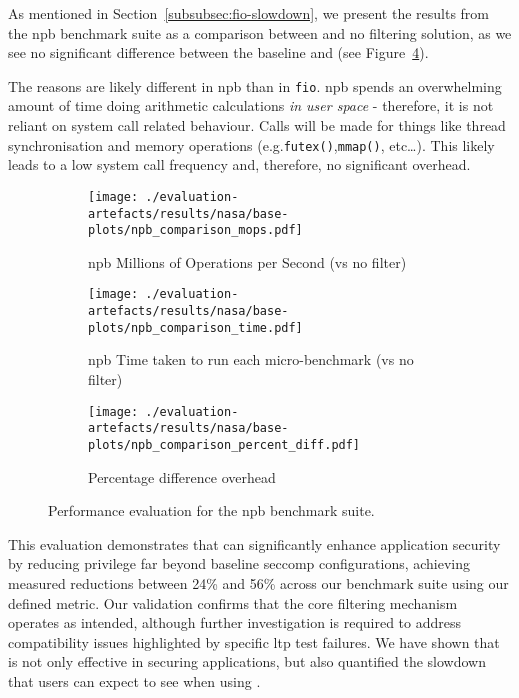 As mentioned in Section~\ref{subsubsec:fio-slowdown}, we present the results
from the \ac{npb} benchmark suite as a comparison between \af and no filtering
solution, as we see no significant difference between the baseline and \af (see
Figure~\ref{fig:npb-perf}).

The reasons are likely different in \ac{npb} than in \texttt{fio}. \ac{npb}
spends an overwhelming amount of time doing arithmetic calculations \textit{in
user space} - therefore, it is not reliant on system call related behaviour.
Calls will be made for things like thread synchronisation and memory 
operations (e.g.\texttt{futex()},{}\texttt{mmap()}, etc\dots). This likely
leads to a low system call frequency and, therefore, no significant overhead.

\begin{figure}[htbp]
    \centering
    \begin{subfigure}[b]{0.7 \textwidth}
        \centering
        \texttt{[image: ./evaluation-artefacts/results/nasa/base-plots/npb\_comparison\_mops.pdf]} 
        \caption{\ac{npb} Millions of Operations per Second (\af vs no filter)}
        \label{fig:npb-mops}
    \end{subfigure}
    \hfill
     \begin{subfigure}[b]{0.7 \textwidth}
        \centering
        \texttt{[image: ./evaluation-artefacts/results/nasa/base-plots/npb\_comparison\_time.pdf]} 
        \caption{\ac{npb} Time taken to run each micro-benchmark (\af vs no
        filter)}
        \label{fig:npb-time}
    \end{subfigure}
     \medskip 
     \begin{subfigure}[b]{0.7 \textwidth}
        \centering
        \texttt{[image: ./evaluation-artefacts/results/nasa/base-plots/npb\_comparison\_percent\_diff.pdf]} %
        \caption{Percentage difference overhead}
        \label{fig:npb-percdiff}
    \end{subfigure}

    \caption{Performance evaluation for the \ac{npb} benchmark suite.}
    \label{fig:npb-perf}
\end{figure}

This evaluation demonstrates that \af can significantly enhance
application security by reducing privilege far beyond baseline seccomp
configurations, achieving measured reductions between 24\% and 56\% across
our benchmark suite using our defined metric. Our validation
confirms that the core filtering mechanism operates as intended, although further
investigation is required to address compatibility issues highlighted by
specific \ac{ltp} test failures. We have shown that \af is not only effective
in securing applications, but also quantified the slowdown that users can 
expect to see when using \af.


